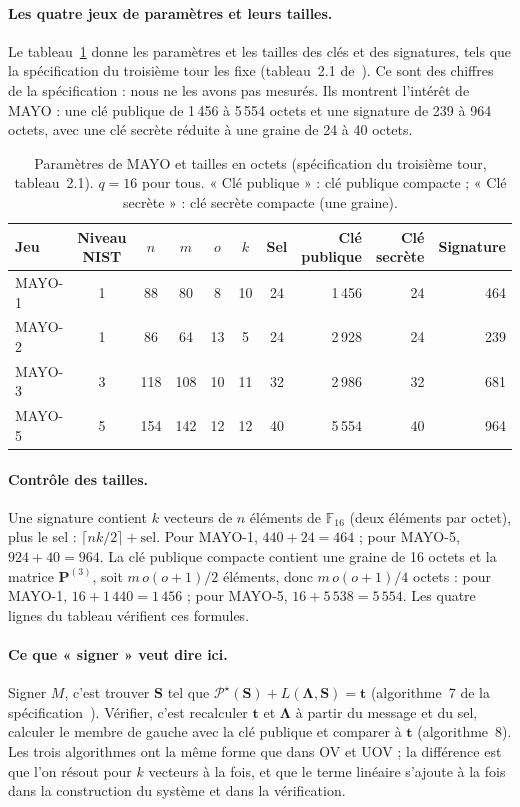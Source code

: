 \paragraph{Les quatre jeux de paramètres et leurs tailles.} Le tableau~\ref{tab:jeux} donne les paramètres et les tailles des clés et des signatures, tels que la spécification du troisième tour les fixe (tableau~2.1 de~\cite{mayospec}). Ce sont des chiffres de la spécification : nous ne les avons pas mesurés. Ils montrent l'intérêt de MAYO : une clé publique de 1\,456 à 5\,554 octets et une signature de 239 à 964 octets, avec une clé secrète réduite à une graine de 24 à 40 octets.
\begin{table}[ht]\centering\small
\caption{Paramètres de MAYO et tailles en octets (spécification du troisième tour, tableau~2.1). $q=16$ pour tous. « Clé publique » : clé publique compacte ; « Clé secrète » : clé secrète compacte (une graine).}\label{tab:jeux}
\begin{tabular}{@{}lccccccrrr@{}}\toprule
Jeu & Niveau NIST & $n$ & $m$ & $o$ & $k$ & Sel & Clé publique & Clé secrète & Signature\\\midrule
MAYO-1 & 1 & 88 & 80 & 8 & 10 & 24 & 1\,456 & 24 & 464\\
MAYO-2 & 1 & 86 & 64 & 13 & 5 & 24 & 2\,928 & 24 & 239\\
MAYO-3 & 3 & 118 & 108 & 10 & 11 & 32 & 2\,986 & 32 & 681\\
MAYO-5 & 5 & 154 & 142 & 12 & 12 & 40 & 5\,554 & 40 & 964\\\bottomrule
\end{tabular}
\end{table}
\paragraph{Contrôle des tailles.} Une signature contient $k$ vecteurs de $n$ éléments de $\mathbb{F}_{16}$ (deux éléments par octet), plus le sel : $\lceil nk/2\rceil+\text{sel}$. Pour MAYO-1, $440+24=464$ ; pour MAYO-5, $924+40=964$. La clé publique compacte contient une graine de 16 octets et la matrice $\mathbf{P}^{(3)}$, soit $m\,o(o+1)/2$ éléments, donc $m\,o(o+1)/4$ octets : pour MAYO-1, $16+1\,440=1\,456$ ; pour MAYO-5, $16+5\,538=5\,554$. Les quatre lignes du tableau vérifient ces formules.

\paragraph{Ce que « signer » veut dire ici.} Signer $M$, c'est trouver $\mathbf{S}$ tel que $\mathcal{P}^\star(\mathbf{S})+L(\boldsymbol{\Lambda},\mathbf{S})=\mathbf{t}$ (algorithme~7 de la spécification~\cite{mayospec}). Vérifier, c'est recalculer $\mathbf{t}$ et $\boldsymbol{\Lambda}$ à partir du message et du sel, calculer le membre de gauche avec la clé publique et comparer à $\mathbf{t}$ (algorithme~8). Les trois algorithmes ont la même forme que dans OV et UOV ; la différence est que l'on résout pour $k$ vecteurs à la fois, et que le terme linéaire s'ajoute à la fois dans la construction du système et dans la vérification.

